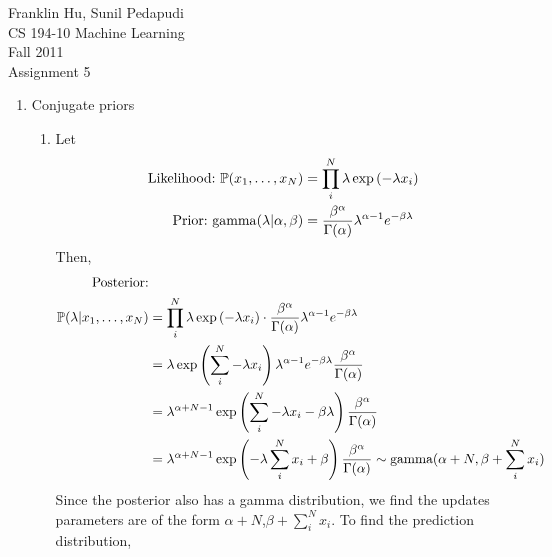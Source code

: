 \documentclass{article}
\begin{document}
Franklin Hu, Sunil Pedapudi \\
CS 194-10 Machine Learning \\
Fall 2011 \\
Assignment 5 \\

\newcommand{\pr}{\mathbb{P}}

\begin{enumerate}
    \item Conjugate priors %
        \begin{enumerate}
            \item %
                Let
                \begin{align*}
                    \textnormal{Likelihood:\ } \pr(x_1,\hdots,x_N) &=
                        \prod_i^N\lambda\exp\left(-\lambda x_i\right)\\
                    \textnormal{Prior:\ } \mathrm{gamma}(\lambda|\alpha,\beta) &=
                        \frac{\beta^\alpha}{\Gamma(\alpha)}\lambda^{\alpha-1}e^{-\beta\lambda}
                \end{align*}
                Then,
                \begin{align*}
                    \textnormal{Posterior:}\\
                    \pr(\lambda|x_1,\hdots,x_N) &=
                        \prod_i^N\lambda\exp\left(-\lambda x_i\right)\cdot
                        \frac{\beta^\alpha}{\Gamma(\alpha)}
                        \lambda^{\alpha-1}e^{-\beta\lambda}\\
                    &=  \lambda \exp\left(\sum_i^N -\lambda x_i\right)
                        \lambda^{\alpha-1}e^{-\beta\lambda}
                        \frac{\beta^\alpha}{\Gamma(\alpha)}\\
                    &=  \lambda^{\alpha+N-1}\exp\left(\sum_i^N -\lambda x_i - \beta\lambda\right)
                        \frac{\beta^\alpha}{\Gamma(\alpha)}\\
                    &=  \lambda^{\alpha+N-1}\exp\left(-\lambda\sum_i^Nx_i + \beta\right)
                        \frac{\beta^\alpha}{\Gamma(\alpha)}
                        \sim \textnormal{gamma}(\alpha+N,\beta+\sum_i^Nx_i)
                \end{align*}
                Since the posterior also has a gamma distribution, we find the
                updates parameters are of the form \(\alpha+N\),\(\beta+\sum_i^Nx_i\).
                To find the prediction distribution,
                \begin{align*}

\end{align*}
\end{enumerate}
\end{enumerate}
\end{document}
